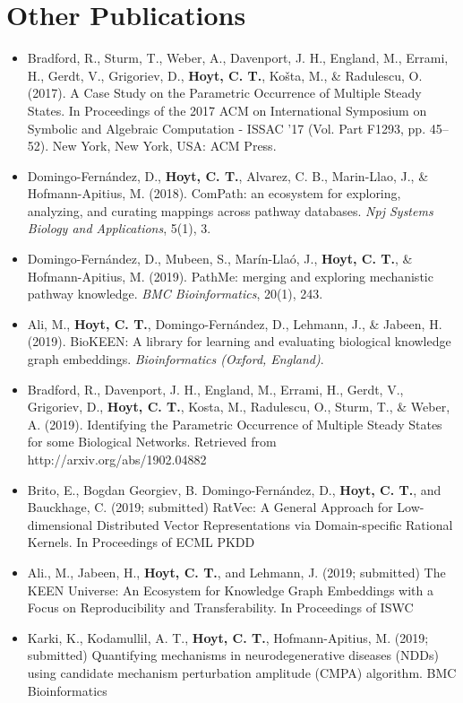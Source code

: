 \section*{Other Publications}

\begin{itemize}
    \item Bradford, R., Sturm, T., Weber, A., Davenport, J. H., England, M., Errami, H., Gerdt, V., Grigoriev, D., \textbf{Hoyt, C. T.}, Košta, M., \& Radulescu, O. (2017). A Case Study on the Parametric Occurrence of Multiple Steady States. In Proceedings of the 2017 ACM on International Symposium on Symbolic and Algebraic Computation - ISSAC ’17 (Vol. Part F1293, pp. 45–52). New York, New York, USA: ACM Press.
    \item Domingo-Fernández, D., \textbf{Hoyt, C. T.}, Alvarez, C. B., Marin-Llao, J., \& Hofmann-Apitius, M. (2018). ComPath: an ecosystem for exploring, analyzing, and curating mappings across pathway databases. \textit{Npj Systems Biology and Applications}, 5(1), 3.
    \item Domingo-Fernández, D., Mubeen, S., Marín-Llaó, J., \textbf{Hoyt, C. T.}, \& Hofmann-Apitius, M. (2019). PathMe: merging and exploring mechanistic pathway knowledge. \textit{BMC Bioinformatics}, 20(1), 243.
    \item Ali, M., \textbf{Hoyt, C. T.}, Domingo-Fernández, D., Lehmann, J., \& Jabeen, H. (2019). BioKEEN: A library for learning and evaluating biological knowledge graph embeddings. \textit{Bioinformatics (Oxford, England)}.
    \item Bradford, R., Davenport, J. H., England, M., Errami, H., Gerdt, V., Grigoriev, D., \textbf{Hoyt, C. T.}, Kosta, M., Radulescu, O., Sturm, T., \& Weber, A. (2019). Identifying the Parametric Occurrence of Multiple Steady States for some Biological Networks. Retrieved from http://arxiv.org/abs/1902.04882
    \item Brito, E., Bogdan Georgiev, B. Domingo-Fernández, D., \textbf{Hoyt, C. T.}, and Bauckhage, C. (2019; submitted) RatVec: A General Approach for Low-dimensional Distributed Vector Representations via Domain-specific Rational Kernels. In Proceedings of ECML PKDD
    \item Ali., M., Jabeen, H., \textbf{Hoyt, C. T.}, and Lehmann, J. (2019; submitted) The KEEN Universe: An Ecosystem for Knowledge Graph Embeddings with a Focus on Reproducibility and Transferability. In Proceedings of ISWC
    \item Karki, K., Kodamullil, A. T., \textbf{Hoyt, C. T.}, Hofmann-Apitius, M. (2019; submitted) Quantifying mechanisms in neurodegenerative diseases (NDDs) using candidate mechanism perturbation amplitude (CMPA) algorithm. BMC Bioinformatics
\end{itemize}

\tableofcontents

